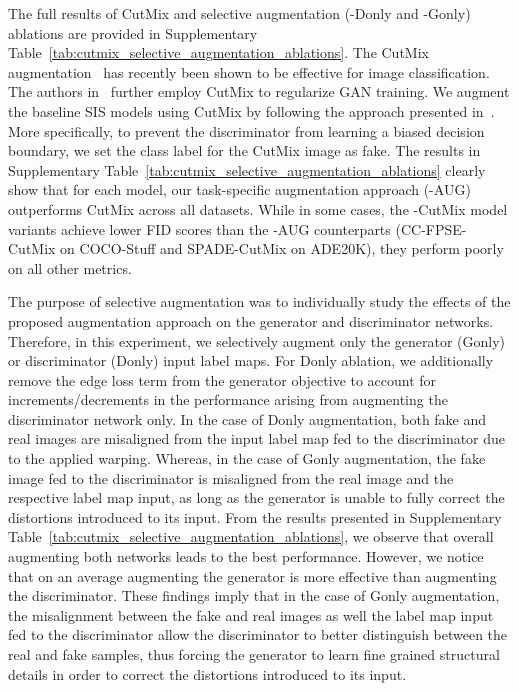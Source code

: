 \documentclass[final]{cvpr}
\newcommand\+{\mkern4mu}
\begin{document}
The full results of CutMix and selective augmentation (-Donly and -Gonly) ablations are provided in Supplementary Table~\ref{tab:cutmix_selective_augmentation_ablations}. The CutMix augmentation~\cite{yun2019cutmix} has recently been shown to be effective for image classification. The authors in~\cite{schonfeld2020u} further employ CutMix to regularize GAN training. We augment the baseline SIS models using CutMix by following the approach presented in~\cite{schonfeld2020u}. More specifically, to prevent the discriminator from learning a biased decision boundary, we set the class label for the CutMix image as fake. The results in Supplementary Table~\ref{tab:cutmix_selective_augmentation_ablations} clearly show that for each model, our task-specific augmentation approach (-AUG) outperforms CutMix across all datasets. While in some cases, the -CutMix model variants achieve lower FID scores than the -AUG counterparts (CC-FPSE-CutMix on COCO-Stuff and SPADE-CutMix on ADE20K), they perform poorly on all other metrics.

The purpose of selective augmentation was to individually study the effects of the proposed augmentation approach on the generator and discriminator networks. Therefore, in this experiment, we selectively augment only the generator (Gonly) or discriminator (Donly) input label maps. For Donly ablation, we additionally remove the edge loss term from the generator objective to account for increments/decrements in the performance arising from augmenting the discriminator network only. In the case of Donly augmentation, both fake and real images are misaligned from the input label map fed to the discriminator due to the applied warping. Whereas, in the case of Gonly augmentation, the fake image fed to the discriminator is misaligned from the real image and the respective label map input, as long as the generator is unable to fully correct the distortions introduced to its input. From the results presented in Supplementary Table~\ref{tab:cutmix_selective_augmentation_ablations}, we observe that overall augmenting both networks leads to the best performance. However, we notice that on an average augmenting the generator is more effective than augmenting the discriminator. These findings imply that in the case of Gonly augmentation, the misalignment between the fake and real images as well the label map input fed to the discriminator allow the discriminator to better distinguish between the real and fake samples, thus forcing the generator to learn fine grained structural details in order to correct the distortions introduced to its input.         
\end{document}
